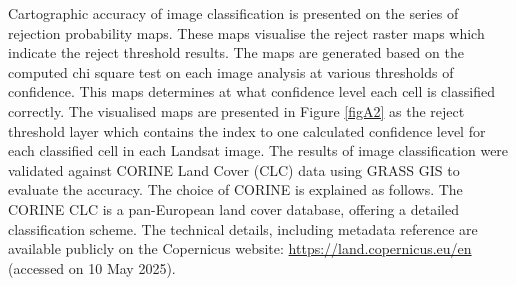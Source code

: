 \documentclass[jimaging,article,accept,pdftex,oneauthor]{Definitions/mdpi}
\begin{document}
{Cartographic accuracy of image classification is presented on the series of rejection probability maps. These maps visualise the reject raster maps which indicate the reject threshold results. The maps are generated based on the computed chi %
 square test on each image analysis at various thresholds of confidence. This maps determines at what confidence level each cell is classified correctly. The visualised maps are presented in Figure} \ref{figA2} as the reject threshold layer which contains the index to one calculated confidence level for each classified cell in each Landsat image. The results of image classification were validated against CORINE Land Cover (CLC) data using GRASS GIS to evaluate the accuracy. The choice of CORINE is explained as follows. The CORINE CLC is a pan-European land cover database, offering a detailed classification scheme. The technical details, including metadata reference are available publicly on the Copernicus website: %
 \url{https://land.copernicus.eu/en} (accessed on 10 May 2025). %
\end{document}
